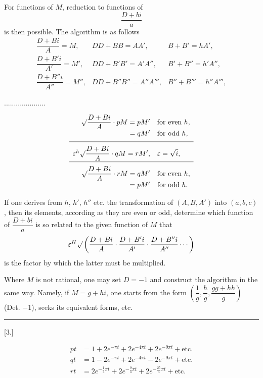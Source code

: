 For functions of $M$, reduction to functions of
\[
\frac{D+bi}{a}
\]
is then possible. The algorithm is as follows
\[
\begin{array}{ccc}
\dfrac{D+Bi}{A}=M,&DD+BB=AA',&B+B'=hA',\\[4pt]
\dfrac{D+B'i}{A'}=M',&DD+B'B'=A'A'',&B'+B''=h'A'',\\[4pt]
\dfrac{D+B''i}{A''}=M'',&DD+B''B''=A''A''',&B''+B'''=h''A''',
\end{array}
\]
\begin{center}.\quad .\quad .\quad .\quad .\quad .\quad .\quad .\quad .\quad .\quad .\quad .\quad .\quad .\quad .\quad .\quad .\quad .\quad .\quad .\quad .\end{center}
\[
\begin{array}{rl}
\mathord{\surd}\dfrac{D+Bi}{A}\cdot pM=pM'&\text{for even }h,\\[4pt]
{}=qM'&\text{for odd }h,\\[5pt]\hline\\[-6pt]
\varepsilon^h\mathord{\surd}\dfrac{D+Bi}{A}\cdot qM=rM',&\varepsilon=\sqrt{i},\\[5pt]\hline\\[-6pt]
\mathord{\surd}\dfrac{D+Bi}{A}\cdot rM=qM'&\text{for even }h,\\[4pt]
{}=pM'&\text{for odd }h.
\end{array}
\]

If one derives from $h$, $h'$, $h''$ etc. the transformation of $(A,B,A')$ into $(a,b,c)$, then its elements, according as they are even or odd, determine which function of $\dfrac{D+bi}{a}$ is so related to the given function of $M$ that
\[
\varepsilon^H\mathord{\surd}\left(\dfrac{D+Bi}{A}\cdot\dfrac{D+B'i}{A'}\cdot\dfrac{D+B''i}{A''}\cdots\right)
\]
is the factor by which the latter must be multiplied.

Where $M$ is not rational, one may set $D=-1$ and construct the algorithm in the same way. Namely, if $M=g+hi$, one starts from the form $\left(\dfrac1g,\dfrac hg,\dfrac{gg+hh}{g}\right)$ (Det. $-1$), seeks its equivalent forms, etc.

\begin{center}\rule{3cm}{.4pt}\end{center}
\begin{center}[3.]\end{center}
\[
\begin{aligned}
pt&=1+2e^{-\pi t}+2e^{-4\pi t}+2e^{-9\pi t}+\text{etc.}\\
qt&=1-2e^{-\pi t}+2e^{-4\pi t}-2e^{-9\pi t}+\text{etc.}\\
rt&=2e^{-\frac14\pi t}+2e^{-\frac94\pi t}+2e^{-\frac{25}4\pi t}+\text{etc.}
\end{aligned}
\]

